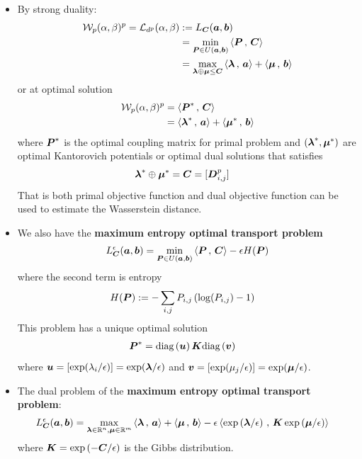 \documentclass[11pt]{article}
\begin{document}
\begin{itemize}
\item By strong duality: 
\begin{align}
{\mathcal W}_{p}(\alpha, \beta)^{p} = {\mathcal L}_{d^{p}}(\alpha, \beta) &:= L_{\boldsymbol{C}}(\boldsymbol{a}, \boldsymbol{b}) \nonumber\\
 &= \min_{\boldsymbol{P} \in U(\boldsymbol{a}, \boldsymbol{b})}\left\langle \boldsymbol{P}\,,\, \boldsymbol{C} \right\rangle\nonumber \\
 &=  \max_{\boldsymbol{\lambda}\oplus \boldsymbol{\mu}  \le \boldsymbol{C}} \left\langle \boldsymbol{\lambda}\,,\, \boldsymbol{a} \right\rangle + \left\langle \boldsymbol{\mu}\,,\, \boldsymbol{b} \right\rangle \label{eqn: optimal_transport_strong_duality}
\end{align} or at optimal solution
\begin{align}
{\mathcal W}_{p}(\alpha, \beta)^{p} &= \left\langle \boldsymbol{P}^{*}\,,\, \boldsymbol{C} \right\rangle \nonumber\\
&=  \left\langle \boldsymbol{\lambda}^{*}\,,\, \boldsymbol{a} \right\rangle + \left\langle \boldsymbol{\mu}^{*}\,,\, \boldsymbol{b} \right\rangle  \label{eqn: optimal_transport_strong_duality2}
\end{align}
 where $\boldsymbol{P}^{*}$ is the optimal coupling matrix for primal problem and $(\boldsymbol{\lambda}^{*}, \boldsymbol{\mu}^{*})$ are optimal Kantorovich potentials or optimal dual solutions that satisfies 
\begin{align}
\boldsymbol{\lambda}^{*}\oplus \boldsymbol{\mu}^{*} &= \boldsymbol{C} = [\boldsymbol{D}_{i,j}^{p}]  \label{eqn: optimal_transport_strong_duality_equality}
\end{align} That is both primal objective function and dual objective function can be used to estimate the Wasserstein distance. 

\item We also have the \textbf{maximum entropy optimal transport problem} 
\begin{align}
L_{\boldsymbol{C}}^{\epsilon}(\boldsymbol{a}, \boldsymbol{b}) = \min_{\boldsymbol{P} \in U(\boldsymbol{a}, \boldsymbol{b})} \left\langle \boldsymbol{P}\,,\, \boldsymbol{C} \right\rangle - \epsilon H(\boldsymbol{P}) \label{eqn: optimal_transport_primal_entropy_reg}
\end{align} where the second term is entropy 
\begin{align}
H(\boldsymbol{P}) &:= -\sum_{i,j}P_{i,j}\left(\log(P_{i,j}) - 1\right) \label{eqn: entropy_regularization}
\end{align} This problem has a unique optimal solution 
\begin{align}
\boldsymbol{P}^{*} &= \text{diag}\left(\boldsymbol{u}\right)\boldsymbol{K}\text{diag}\left(\boldsymbol{v}\right)  \label{eqn: optimal_transport_primal_kl_sol2}
\end{align} where  $\boldsymbol{u} = [\exp(\lambda_i / \epsilon)] = \exp(\boldsymbol{\lambda}/\epsilon)$ and $\boldsymbol{v} =  [\exp(\mu_j / \epsilon)] = \exp(\boldsymbol{\mu}/\epsilon)$.

\item The dual problem of the \textbf{maximum entropy optimal transport problem}:
\begin{align}
L_{\boldsymbol{C}}^{\epsilon}(\boldsymbol{a}, \boldsymbol{b}) = \max_{\boldsymbol{\lambda} \in {\mathbb R}^{n}, \boldsymbol{\mu} \in {\mathbb R}^{m}}& \left\langle \boldsymbol{\lambda}\,,\, \boldsymbol{a} \right\rangle + \left\langle \boldsymbol{\mu}\,,\, \boldsymbol{b} \right\rangle - \epsilon \left\langle \exp\left(\boldsymbol{\lambda}/\epsilon\right)\,,\, \boldsymbol{K}\exp\left(\boldsymbol{\mu}/\epsilon\right) \right\rangle \label{eqn: optimal_transport_dual_entropy_reg}
\end{align} where $\boldsymbol{K} = \exp\left(-\boldsymbol{C}/\epsilon\right)$ is the Gibbs distribution. 


\end{itemize}
\end{document}
